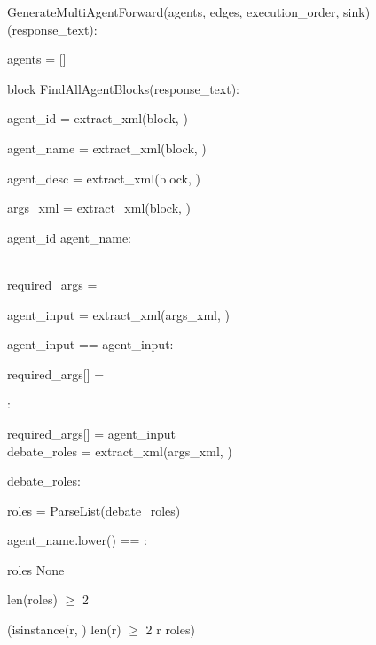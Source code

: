 \begin{subagent}[title=高 DoM 解析器]
\quad {} GenerateMultiAgentForward(agents, edges, execution\_order, sink) \\



 (response\_text):

\quad agents = []

\quad {}

\quad {} block  FindAllAgentBlocks(response\_text):

\quad\quad agent\_id = extract\_xml(block, )

\quad\quad agent\_name = extract\_xml(block, )

\quad\quad agent\_desc = extract\_xml(block, )

\quad\quad args\_xml = extract\_xml(block, )

\quad\quad {}  agent\_id   agent\_name:

\quad\quad\quad {} \\

\quad\quad required\_args = \code{\{\}}

\quad\quad agent\_input = extract\_xml(args\_xml, )

\quad\quad {} agent\_input ==    agent\_input:

\quad\quad\quad required\_args[] = 

\quad\quad {}:

\quad\quad\quad required\_args[] = agent\_input \\

\quad\quad debate\_roles = extract\_xml(args\_xml, )

\quad\quad {} debate\_roles:

\quad\quad\quad roles = ParseList(debate\_roles)

\quad\quad\quad {} agent\_name.lower() == :

\quad\quad\quad\quad {} roles   None

\quad\quad\quad\quad {} len(roles) $\geq$ 2

\quad\quad\quad\quad {} (isinstance(r, )  len(r) $\geq$ 2  r  roles)


\end{subagent}
